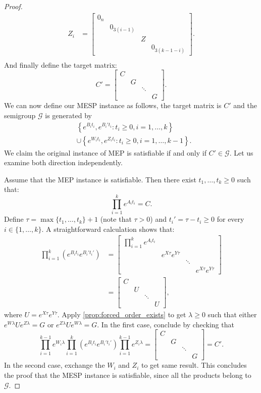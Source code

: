 \begin{proof}
\begin{align*}
Z_{i}&=\begin{bmatrix}0_n&&&\\&0_{3(i-1)}&&\\&&Z&\\&&&0_{3(k-1-i)}\end{bmatrix}.\\
\end{align*}
And finally define the target matrix:
\[C'=\begin{bmatrix}C&&&\\&G&&\\&&\ddots&\\&&&G\end{bmatrix}.\]
We can now define our MESP instance as follows, the target matrix is $C'$ and the semigroup $\mathcal{G}$
is generated by
\begin{align*}
&\left\lbrace e^{B_{i}t_{i}},e^{B_{i}'t_{i}}:t_{i}\geqslant0,i=1,\ldots,k\right\rbrace \\
&\cup\left\lbrace e^{W_{i}t_{i}},e^{Z_{i}t_{i}}:t_{i}\geqslant0,i=1,\ldots,k-1\right\rbrace.
\end{align*}
We claim the original instance of MEP is satisfiable if and only if $C'\in\mathcal{G}$.
Let us examine both direction independently.

Assume that the MEP instance is satisfiable. Then there exist $t_1,\ldots,t_k\geqslant0$ such that:
\[\prod_{i=1}^{k}e^{A_{i}t_{i}}=C.\]
Define $\tau=\max\lbrace t_1,\ldots,t_k\rbrace+1$ (note that $\tau>0$) and $t_{i}'=\tau-t_{i}\geqslant0$ for every $i\in\lbrace 1,\ldots,k\rbrace$.
A straightforward calculation shows that:
\begin{align*}
\prod_{i=1}^{k}\left(e^{B_{i}t_{i}}e^{B_{i}'t_{i}'}\right)
    &=\begin{bmatrix}\prod_{i=1}^{k}e^{A_{i}t_{i}}&&&\\&e^{X\tau}e^{Y\tau}&&\\&&\ddots&\\&&&e^{X\tau}e^{Y\tau}\end{bmatrix}\\
    &=\begin{bmatrix}C&&&\\&U&&\\&&\ddots&\\&&&U\end{bmatrix},
\end{align*}
where $U=e^{X\tau}e^{Y\tau}$. Apply \cref{prop:forced_order_exists} to get $\lambda\geqslant0$
such that either $e^{W\lambda}Ue^{Z\lambda}=G$ or $e^{Z\lambda}Ue^{W\lambda}=G$. In the first case, conclude by
checking that
\[
\prod_{i=1}^{k-1}e^{W_{i}\lambda}\prod_{i=1}^{k}\left(e^{B_{i}t_{i}}e^{B_{i}'t_{i}'}\right)\prod_{i=1}^{k-1}e^{Z_{i}\lambda}
    =\begin{bmatrix}C&&&\\&G&&\\&&\ddots&\\&&&G\end{bmatrix}=C'.
\]
In the second case, exchange the $W_{i}$ and $Z_{i}$ to get same result. This concludes the proof that
the MESP instance is satisfiable, since all the products belong to $\mathcal{G}$.


\end{proof}
